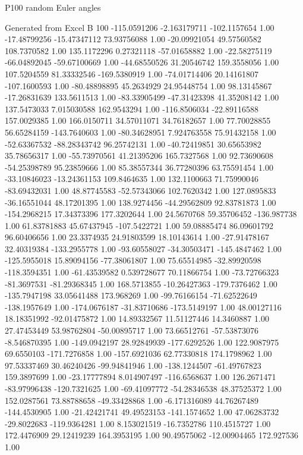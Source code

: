 P100 random Euler angles

Generated from Excel
B 100
-115.0591206	-2.163179711	-102.1157654 1.00
-17.48799256	-15.47347112	73.93756088 1.00
-20.09921054	49.57560582	108.7370582 1.00
135.1172296	0.27321118	-57.01658882 1.00
-22.58275119	-66.04892045	-59.67100669 1.00
-44.68550526	31.20546742	159.3558056 1.00
107.5204559	81.33332546	-169.5380919 1.00
-74.01714406	20.14161807	-107.1600593 1.00
-80.48898895	45.2634929	24.95448754 1.00
98.13145867	-17.26831639	133.5611513 1.00
-83.33905499	-47.31423398	41.35208142 1.00
137.5473033	7.015030588	162.9543294 1.00
-116.8506034	-22.89116588	157.0029385 1.00
166.0150711	34.57011071	34.76182657 1.00
77.70028855	56.65284159	-143.7640603 1.00
-80.34628951	7.924763558	75.91432158 1.00
-52.63367532	-88.28343742	96.25742131 1.00
-40.72419851	30.65653982	35.78656317 1.00
-55.73970561	41.21395206	165.7327568 1.00
92.73690608	-54.25398789	95.23859666 1.00
85.38557344	36.77280396	63.75591454 1.00
-33.10846023	-13.24361153	109.8464635 1.00
132.1100663	71.75990046	-83.69432031 1.00
48.87745583	-52.57343066	102.7620342 1.00
127.0895833	-36.16551044	48.17201395 1.00
138.9274456	-44.29562809	92.83781873 1.00
-154.2968215	17.34373396	177.3202644 1.00
24.5670768	59.35706452	-136.987738 1.00
61.83781883	45.67437945	-107.5422721 1.00
59.08885474	86.09601792	96.60406656 1.00
23.3374935	24.91803599	18.10143614 1.00
-27.91478167	32.40319384	-133.2955778 1.00
-93.60558027	-34.30503471	-145.4847462 1.00
-125.5955018	15.89094156	-77.38061807 1.00
75.65514985	-32.89920598	-118.3594351 1.00
-61.43539582	0.539728677	70.11866754 1.00
-73.72766323	-81.3697531	-81.29368345 1.00
168.5713855	-10.26427363	-179.7376462 1.00
-135.7947198	33.05641488	173.968269 1.00
-99.76166154	-71.62522649	-138.1957649 1.00
-174.0676187	-31.83710686	-173.5149197 1.00
48.00127116	18.18351992	-92.01475872 1.00
14.89332567	11.51127446	14.3460887 1.00
27.47453449	53.98762804	-50.00895717 1.00
73.66512761	-57.53873076	-8.546870395 1.00
-149.0942197	28.92849939	-177.6292526 1.00
122.9087975	69.6550103	-171.7276858 1.00
-157.6921036	62.77330818	174.1798962 1.00
97.53337469	30.46240426	-99.94841946 1.00
-138.1244507	-61.49767823	159.3897699 1.00
-23.17777894	8.014907497	-116.6568637 1.00
126.2671471	-83.97996438	-120.7321625 1.00
-69.41097772	-54.28346538	48.37525372 1.00
152.0287561	73.88788658	-49.33428868 1.00
-6.171316089	44.76267489	-144.4530905 1.00
-21.42421741	49.49523153	-141.1574652 1.00
47.06283732	-29.8022683	-119.9364281 1.00
8.153021519	-16.7352786	110.4515727 1.00
172.4476909	29.12419239	164.3953195 1.00
90.49575062	-12.00904465	172.927536 1.00
